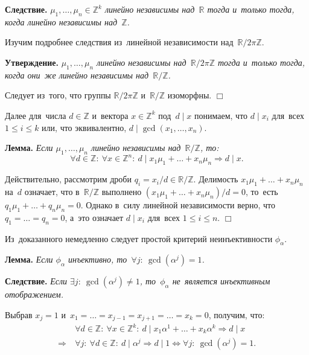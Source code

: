 \documentclass[twoside]{article}
\begin{document}
\medskip\noindent\textbf{Следствие.}\emph{
    $\mu_1, \ldots, \mu_n \in \mathbb{Z}^k$ линейно независимы над~$\mathbb{R}$ тогда и~только тогда, когда линейно независимы над~$\mathbb{Z}$.
}\medskip

Изучим подробнее следствия из~линейной независимости над~$\mathbb{R} / 2 \pi \mathbb{Z}$.

\medskip\noindent\textbf{Утверждение.}\emph{
    $\mu_1, \ldots, \mu_n$ линейно независимы над~$\mathbb{R} / 2 \pi \mathbb{Z}$
    тогда и~только тогда, когда они~же линейно независимы над~$\mathbb{R} / \mathbb{Z}$.
}\medskip

    Следует из~того, что группы $\mathbb{R} / 2 \pi \mathbb{Z}$ и~$\mathbb{R} / \mathbb{Z}$ изоморфны.
\hfill$\Box$\medskip

Далее для~числа $d \in \mathbb{Z}$ и~вектора $x \in \mathbb{Z}^k$ под~$d \mid x$ понимаем, что $d \mid x_i$ для~всех $1 \leq i \leq k$
или, что эквивалентно, $d \mid \gcd(x_1, \ldots, x_n)$.

\medskip\noindent\textbf{Лемма.}\emph{
    Если $\mu_1, \ldots, \mu_n$ линейно независимы над~$\mathbb{R} / \mathbb{Z}$, то:
    $$
        \forall d \in \mathbb{Z}{:}\ \forall x \in \mathbb{Z}^n{:}\ d \mid x_1 \mu_1 + \ldots + x_n \mu_n \Rightarrow d \mid x.
    $$
}\medskip

    Действительно, рассмотрим дроби $q_i = x_i / d \in \mathbb{R} / \mathbb{Z}$. Делимость $x_1 \mu_1 + \ldots + x_n \mu_n$ на~$d$ означает,
    что в~$\mathbb{R} / \mathbb{Z}$ выполнено $(x_1 \mu_1 + \ldots + x_n \mu_n) / d = 0$, то~есть $q_1 \mu_1 + \ldots + q_n \mu_n = 0$.
    Однако в~силу линейной независимости верно, что $q_1 = \ldots = q_n = 0$, а~это означает $d \mid x_i$ для~всех $1 \leq i \leq n$.
\hfill$\Box$\medskip

Из~доказанного немедленно следует простой критерий неинъективности $\phi_\alpha$.

\medskip\noindent\textbf{Лемма.}\emph{
    Если $\phi_\alpha$ инъективно, то~$\forall j{:}\ \gcd(\alpha^j) = 1$.
}

\medskip\noindent\textbf{Следствие.}\emph{
    Если $\exists j{:}\ \gcd(\alpha^j) \neq 1$, то~$\phi_\alpha$ не~является инъективным отображением.
}\medskip

    Выбрав $x_j = 1$ и~$x_1 = \ldots = x_{j - 1} = x_{j + 1} = \ldots = x_k = 0$, получим, что:
    \begin{align*}
                         & \forall d \in \mathbb{Z}{:}\ \forall x \in \mathbb{Z}^k{:}\ d \mid x_1 \alpha^1 + \ldots + x_k \alpha^k \Rightarrow d \mid x \\
            \Rightarrow\ & \forall j{:}\ \forall d \in \mathbb{Z}{:}\ d \mid \alpha^j \Rightarrow d \mid 1
        \Leftrightarrow \forall j{:}\ \gcd(\alpha^j) = 1.
        \tag*{$\Box$}
    \end{align*}
{}
\end{document}
